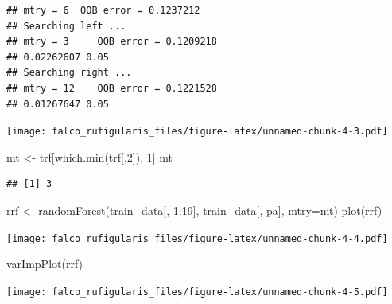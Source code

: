 \documentclass[
]{article}
\newenvironment{Shaded}{\begin{snugshade}}{\end{snugshade}}
\newcommand{\AttributeTok}[1]{\textcolor[rgb]{0.77,0.63,0.00}{#1}}
\newcommand{\DecValTok}[1]{\textcolor[rgb]{0.00,0.00,0.81}{#1}}
\newcommand{\FunctionTok}[1]{\textcolor[rgb]{0.00,0.00,0.00}{#1}}
\newcommand{\NormalTok}[1]{#1}
\newcommand{\OtherTok}[1]{\textcolor[rgb]{0.56,0.35,0.01}{#1}}
\newcommand{\SpecialCharTok}[1]{\textcolor[rgb]{0.00,0.00,0.00}{#1}}
\newcommand{\StringTok}[1]{\textcolor[rgb]{0.31,0.60,0.02}{#1}}
\begin{document}
\begin{verbatim}
## mtry = 6  OOB error = 0.1237212 
## Searching left ...
## mtry = 3     OOB error = 0.1209218 
## 0.02262607 0.05 
## Searching right ...
## mtry = 12    OOB error = 0.1221528 
## 0.01267647 0.05
\end{verbatim}

\texttt{[image: falco\_rufigularis\_files/figure-latex/unnamed-chunk-4-3.pdf]}

\begin{Shaded}
\begin{Highlighting}[]
\NormalTok{mt }\OtherTok{\textless{}{-}}\NormalTok{ trf[}\FunctionTok{which.min}\NormalTok{(trf[,}\DecValTok{2}\NormalTok{]), }\DecValTok{1}\NormalTok{]}
\NormalTok{mt}
\end{Highlighting}
\end{Shaded}

\begin{verbatim}
## [1] 3
\end{verbatim}

\begin{Shaded}
\begin{Highlighting}[]
\NormalTok{rrf }\OtherTok{\textless{}{-}} \FunctionTok{randomForest}\NormalTok{(train\_data[, }\DecValTok{1}\SpecialCharTok{:}\DecValTok{19}\NormalTok{], train\_data[, }\StringTok{\textquotesingle{}pa\textquotesingle{}}\NormalTok{], }\AttributeTok{mtry=}\NormalTok{mt)}
\FunctionTok{plot}\NormalTok{(rrf)}
\end{Highlighting}
\end{Shaded}

\texttt{[image: falco\_rufigularis\_files/figure-latex/unnamed-chunk-4-4.pdf]}

\begin{Shaded}
\begin{Highlighting}[]
\FunctionTok{varImpPlot}\NormalTok{(rrf)}
\end{Highlighting}
\end{Shaded}

\texttt{[image: falco\_rufigularis\_files/figure-latex/unnamed-chunk-4-5.pdf]}

\begin{Shaded}
\end{Shaded}
\end{document}
